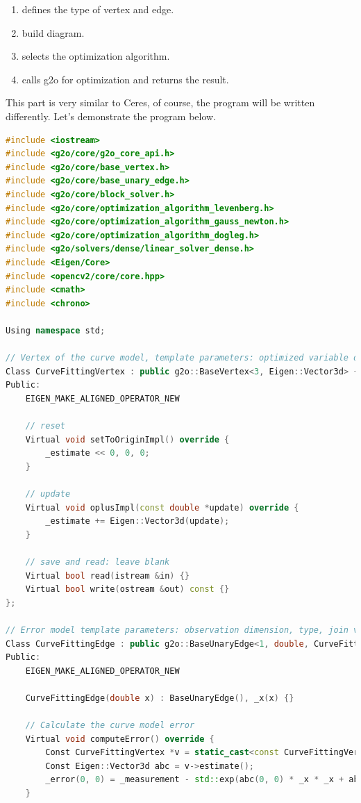 \begin{enumerate}
	\item defines the type of vertex and edge.
	\item build diagram.
	\item selects the optimization algorithm.
	\item calls g2o for optimization and returns the result.
\end{enumerate}

This part is very similar to Ceres, of course, the program will be written differently. Let's demonstrate the program below.

\begin{lstlisting}[language=c++,caption=slambook/ch6/g2oCurveFitting.cpp]
#include <iostream>
#include <g2o/core/g2o_core_api.h>
#include <g2o/core/base_vertex.h>
#include <g2o/core/base_unary_edge.h>
#include <g2o/core/block_solver.h>
#include <g2o/core/optimization_algorithm_levenberg.h>
#include <g2o/core/optimization_algorithm_gauss_newton.h>
#include <g2o/core/optimization_algorithm_dogleg.h>
#include <g2o/solvers/dense/linear_solver_dense.h>
#include <Eigen/Core>
#include <opencv2/core/core.hpp>
#include <cmath>
#include <chrono>

Using namespace std;

// Vertex of the curve model, template parameters: optimized variable dimensions and data types
Class CurveFittingVertex : public g2o::BaseVertex<3, Eigen::Vector3d> {
Public:
    EIGEN_MAKE_ALIGNED_OPERATOR_NEW
    
    // reset
    Virtual void setToOriginImpl() override {
        _estimate << 0, 0, 0;
    }
    
    // update
    Virtual void oplusImpl(const double *update) override {
        _estimate += Eigen::Vector3d(update);
    }
    
    // save and read: leave blank
    Virtual bool read(istream &in) {}
    Virtual bool write(ostream &out) const {}
};

// Error model template parameters: observation dimension, type, join vertex type
Class CurveFittingEdge : public g2o::BaseUnaryEdge<1, double, CurveFittingVertex> {
Public:
    EIGEN_MAKE_ALIGNED_OPERATOR_NEW
    
    CurveFittingEdge(double x) : BaseUnaryEdge(), _x(x) {}
    
    // Calculate the curve model error
    Virtual void computeError() override {
        Const CurveFittingVertex *v = static_cast<const CurveFittingVertex *> (_vertices[0]);
        Const Eigen::Vector3d abc = v->estimate();
        _error(0, 0) = _measurement - std::exp(abc(0, 0) * _x * _x + abc(1, 0) * _x + abc(2, 0));
    }
    

\end{lstlisting}
